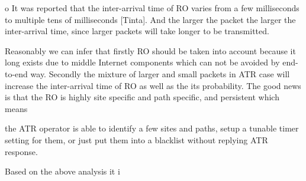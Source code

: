 o  It was reported that the inter-arrival time of RO varies from a
   few milliseconds to multiple tens of milliseconds [Tinta].  And
   the larger the packet the larger the inter-arrival time, since
   larger packets will take longer to be transmitted.

Reasonably we can infer that firstly RO should be taken into account
because it long exists due to middle Internet components which can
not be avoided by end-to-end way.  Secondly the mixture of larger and
small packets in ATR case will increase the inter-arrival time of RO
as well as the its probability.  The good news is that the RO is
highly site specific and path specific, and persistent which means

the ATR operator is able to identify a few sites and paths, setup a
tunable timer setting for them, or just put them into a blacklist
without replying ATR response.

Based on the above analysis it i